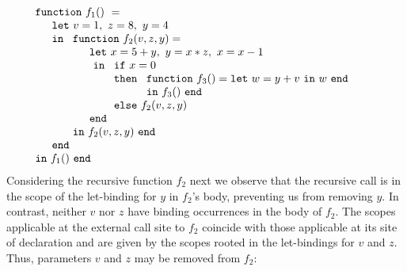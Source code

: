 \begin{equation}
\label{FunctionalConstructionProgram5}
\begin{array}{l}
\texttt{function}\ f_1()\ = \\
  \quad
  \begin{array}{l}
     \texttt{let}\ v = 1, \ 
                   z = 8, \ 
                   y = 4\\
     \texttt{in}\ 
     \begin{array}[t]{l}
       \texttt{function}\ f_2(v,z,y) =\\
         \quad
         \begin{array}{l}
           \texttt{let}\ x = 5+y,\
                         y = x*z,\
                         x = x-1\\\
           \texttt{in}\
           \begin{array}[t]{l}
             \texttt{if}\ x=0\\ 
             \texttt{then}\ 
               \begin{array}[t]{l}
                 \texttt{function}\ f_3() = 
                 \texttt{let}\ w = y+v\ \texttt{in}\ w\ \texttt{end}\\
                 \texttt{in}\ f_3()\ \texttt{end}
               \end{array}\\
             \texttt{else}\ f_2(v,z,y)
           \end{array}\\
           \texttt{end}
         \end{array}\\
     \texttt{in}\ f_2(v,z,y)\ \texttt{end}
     \end{array}\\
     \texttt{end}\\
   \end{array}\\
\texttt{in}\ f_1()\ \texttt{end}
\end{array}
\end{equation}
Considering the recursive function $f_2$ next we observe that the
recursive call is in the scope of the let-binding for $y$ in $f_2$'s
body, preventing us from removing $y$.  In contrast, neither $v$ nor
$z$ have binding occurrences in the body of $f_2$. The scopes
applicable at the external call site to $f_2$ coincide with those
applicable at its site of declaration and are given by the scopes
rooted in the let-bindings for $v$ and $z$. Thus, parameters $v$ and
$z$ may be removed from $f_2$:
